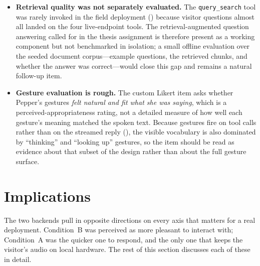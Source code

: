 \begin{itemize}
    \item \textbf{Retrieval quality was not separately evaluated.}
    The \texttt{query\_search} tool was rarely invoked in the field deployment () because visitor questions almost all landed on the four live-endpoint tools.
    The retrieval-augmented question answering called for in the thesis assignment is therefore present as a working component but not benchmarked in isolation; a small offline evaluation over the seeded document corpus---example questions, the retrieved chunks, and whether the answer was correct---would close this gap and remains a natural follow-up item.

    \item \textbf{Gesture evaluation is rough.}
    The custom Likert item asks whether Pepper's gestures \emph{felt natural and fit what she was saying}, which is a perceived-appropriateness rating, not a detailed measure of how well each gesture's meaning matched the spoken text.
    Because gestures fire on tool calls rather than on the streamed reply (), the visible vocabulary is also dominated by ``thinking'' and ``looking up'' gestures, so the item should be read as evidence about that subset of the design rather than about the full gesture surface.
\end{itemize}


\section{Implications}
\label{sec:implications}

The two backends pull in opposite directions on every axis that matters for a real deployment.
Condition~B was perceived as more pleasant to interact with; Condition~A was the quicker one to respond, and the only one that keeps the visitor's audio on local hardware.
The rest of this section discusses each of these in detail.

